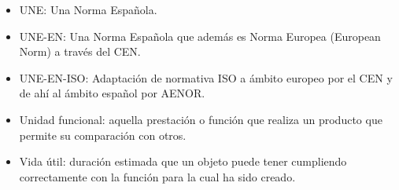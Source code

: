 \begin{itemize}
  \item UNE: Una Norma Española.
  \item UNE-EN: Una Norma Española que además es Norma Europea (European Norm) a través del CEN.
  \item UNE-EN-ISO: Adaptación de normativa ISO a ámbito europeo por el CEN y de ahí al ámbito español por AENOR.
  \item Unidad funcional: aquella prestación o función que realiza un producto que permite su comparación con otros.
  \item Vida útil: duración estimada que un objeto puede tener cumpliendo correctamente con la función para la cual ha sido creado.
\end{itemize}

